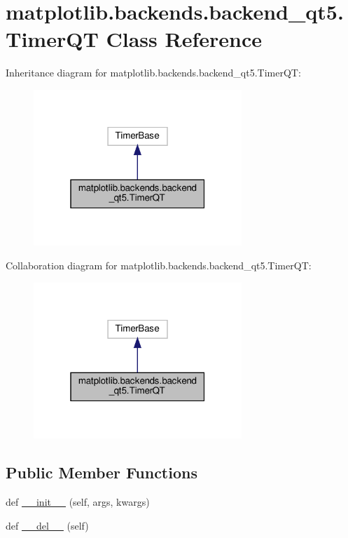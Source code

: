 \hypertarget{classmatplotlib_1_1backends_1_1backend__qt5_1_1TimerQT}{}\section{matplotlib.\+backends.\+backend\+\_\+qt5.\+Timer\+QT Class Reference}
\label{classmatplotlib_1_1backends_1_1backend__qt5_1_1TimerQT}


Inheritance diagram for matplotlib.\+backends.\+backend\+\_\+qt5.\+Timer\+QT\+:
\nopagebreak
\begin{figure}[H]
\begin{center}
\leavevmode
\includegraphics[width=223pt]{classmatplotlib_1_1backends_1_1backend__qt5_1_1TimerQT__inherit__graph}
\end{center}
\end{figure}


Collaboration diagram for matplotlib.\+backends.\+backend\+\_\+qt5.\+Timer\+QT\+:
\nopagebreak
\begin{figure}[H]
\begin{center}
\leavevmode
\includegraphics[width=223pt]{classmatplotlib_1_1backends_1_1backend__qt5_1_1TimerQT__coll__graph}
\end{center}
\end{figure}
\subsection*{Public Member Functions}
\begin{DoxyCompactItemize}
\item 
def \hyperlink{classmatplotlib_1_1backends_1_1backend__qt5_1_1TimerQT_a859ab4d3fcebd99ceac198a8be1c34bf}{\+\_\+\+\_\+init\+\_\+\+\_\+} (self, args, kwargs)
\item 
def \hyperlink{classmatplotlib_1_1backends_1_1backend__qt5_1_1TimerQT_afce35789ef77386931a91a4b04c94d9d}{\+\_\+\+\_\+del\+\_\+\+\_\+} (self)
\end{DoxyCompactItemize}


